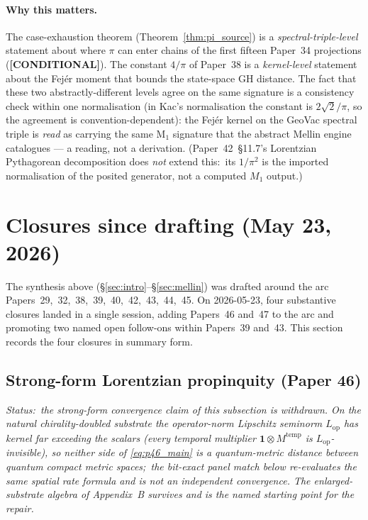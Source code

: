 \documentclass[11pt,a4paper]{article}
\theoremstyle{plain}
\theoremstyle{definition}
\newcommand{\gvc}[2]{#2}
\begin{document}
\paragraph{Why this matters.}
\gvc{pi-source-case-exhaustion}{The case-exhaustion theorem (Theorem~\ref{thm:pi_source}) is a
\emph{spectral-triple-level} statement about where $\pi$ can enter
chains of the first fifteen Paper~34 projections (\textbf{[CONDITIONAL]})}.  The constant
$4/\pi$ of Paper~38 is a \emph{kernel-level} statement about the
Fej\'er moment that bounds the state-space GH distance.  The fact that these two abstractly-different
levels agree on the same signature is a consistency check within one
normalisation (in Kac's normalisation the constant is $2\sqrt2/\pi$, so
the agreement is convention-dependent): the Fej\'er kernel on the
GeoVac spectral triple is \emph{read} as carrying the same M$_{1}$
signature that the abstract Mellin engine catalogues --- a reading, not a
derivation.  (Paper~42~\S 11.7's
Lorentzian Pythagorean decomposition does \emph{not} extend this:\ its
$1/\pi^{2}$ is the imported normalisation of the posited generator, not a
computed $M_1$ output.)

\section{Closures since drafting (May 23, 2026)}
\label{sec:closures_post_45}

The synthesis above (\S\ref{sec:intro}--\S\ref{sec:mellin})
was drafted around the arc Papers~29,~32,~38,~39,~40,~42,~43,~44,~45.
On 2026-05-23, four substantive closures landed in a single session,
adding Papers~46 and~47 to the arc and promoting two named open
follow-ons within Papers~39 and~43.  This section records the four
closures in summary form.

\subsection{Strong-form Lorentzian propinquity (Paper 46)}
\label{sec:closures_paper46}

\emph{Status:\ the strong-form convergence claim of this subsection
is withdrawn.
On the natural chirality-doubled substrate the operator-norm Lipschitz
seminorm $L_{\mathrm{op}}$ has kernel far exceeding the scalars (every
temporal multiplier $\mathbf{1} \otimes M^{\mathrm{temp}}$ is
$L_{\mathrm{op}}$-invisible), so neither side of \eqref{eq:p46_main}
is a quantum-metric distance between quantum compact metric spaces;\
the bit-exact panel match below re-evaluates the same spatial rate
formula and is not an independent convergence.  The enlarged-substrate
algebra of Appendix~B survives and is the named starting point for the
repair.}
\end{document}

